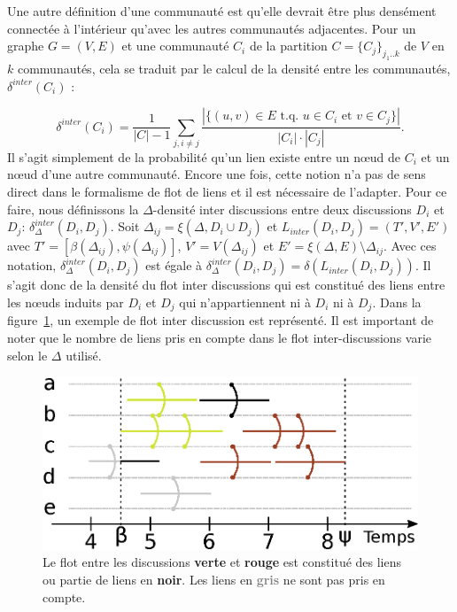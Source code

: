 Une autre définition d'une communauté est qu'elle devrait être plus densément connectée à l'intérieur qu'avec les autres communautés adjacentes.
Pour un graphe $G=(V,E)$ et une communauté $C_i$ de la partition $C = \{C_j\}_{j_1..k}$ de $V$ en $k$ communautés, cela se traduit par le calcul de la densité entre les communautés, $\delta^{inter}(C_i)$ :

\begin{equation}
	\delta^{inter}(C_i) = \frac{1}{|C|-1}\sum_{j, i\ne j}\frac{|\{(u,v)\in E\mbox{ t.q. }u\in C_i\mbox{ et }v\in C_j\}|}{|C_i|\cdot |C_j|}.
\end{equation}
Il s'agit simplement de la probabilité qu'un lien existe entre un n\oe{}ud de $C_i$ et un n\oe{}ud d'une autre communauté.
Encore une fois, cette notion n'a pas de sens direct dans le formalisme de flot de liens et il est nécessaire de l'adapter.
Pour ce faire, nous définissons la $\Delta$-densité inter discussions entre deux discussions $D_i$ et $D_j$: $\delta^{inter}_{\Delta}(D_i,D_j)$.
Soit $\Delta_{ij}=\xi(\Delta,D_i \cup D_j)$ et $L_{inter}(D_i, D_j) = (T',V',E')$ avec  $T'=[\beta(\Delta_{ij}),\psi(\Delta_{ij})]$, $V'= V(\Delta_{ij})$ et $E' = \xi(\Delta,E) \setminus \Delta_{ij}$.
Avec ces notation, $\delta^{inter}_{\Delta}(D_i,D_j)$ est égale à $\delta^{inter}_{\Delta}(D_i,D_j) = \delta(L_{inter}(D_i, D_j))$.
Il s'agit donc de la densité du flot inter discussions qui est constitué des liens entre les n\oe{}uds induits par $D_i$ et $D_j$ qui n'appartiennent ni à $D_i$ ni à $D_j$.
Dans la figure~\ref{fig:inter_dens_discussion_ex}, un exemple de flot inter discussion est représenté.
Il est important de noter que le nombre de liens pris en compte dans le flot inter-discussions varie selon le $\Delta$ utilisé.

\begin{figure}
\centering
	\includegraphics[width=0.65\linewidth]{img/mailing/inter_flot.eps}
\caption{Le flot entre les discussions \textcolor{olivegreen}{\textbf{verte}} et  \textcolor{briquered}{\textbf{rouge}} est constitué des liens ou partie de liens en \textbf{noir}. Les liens en \textcolor{gray}{\textbf{gris}} ne sont pas pris en compte.}
\label{fig:inter_dens_discussion_ex}
\end{figure}



